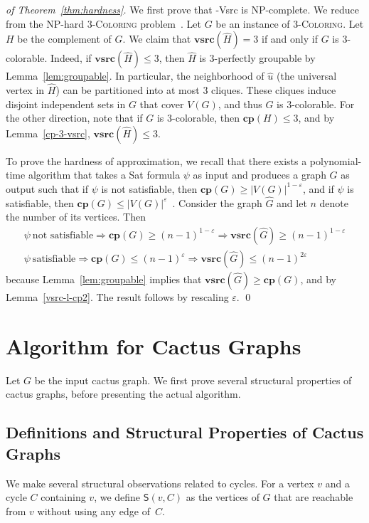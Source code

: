 \documentclass[letter,runningheads,envcountsame,envcountsect]{llncs}
\newcommand{\vsrc}{\mathbf{vsrc}}
\newcommand{\tvsrc}{{\sc 3-Vsrc}}
\newcommand{\cp}{\mathbf{cp}}
\newcommand{\sat}{{\sc Sat}}
\newcommand{\subg}{\mathsf{S}}
\begin{document}
\begin{proof}[of Theorem~\ref{thm:hardness}]
	We first prove that {\tvsrc} is NP-complete. We reduce from the NP-hard \textsc{$3$-Coloring} problem~\cite{gary1979computers}. Let $G$ be an instance of \textsc{$3$-Coloring}. Let $H$ be the complement of $G$. We claim that $\vsrc(\hat{H}) = 3$ if and only if $G$ is $3$-colorable. Indeed, if $\vsrc(\hat{H}) \leq 3$, then $\hat{H}$ is $3$-perfectly groupable by Lemma~\ref{lem:groupable}. In particular, the neighborhood of $\hat{u}$ (the universal vertex in $\hat{H}$) can be partitioned into at most $3$ cliques. These cliques induce disjoint independent sets in $G$ that cover $V(G)$, and thus $G$ is $3$-colorable. For the other direction, note that if $G$ is $3$-colorable, then $\cp(H) \leq 3$, and by Lemma~\ref{cp-3-vsrc}, $\vsrc(\hat{H}) \leq 3$.

To prove the hardness of approximation, we recall that there exists a polynomial-time algorithm that takes a {\sat} formula $\psi$ as input and produces a graph $G$ as output such that if $\psi$ is not satisfiable, then $\cp(G) \geq |V(G)|^{1-\varepsilon}$, and if $\psi$ is satisfiable, then $\cp(G)  \leq |V(G)|^{\varepsilon}$~\cite[Proof of Theorem 2]{zuckerman2006linear}. Consider the graph $\hat{G}$ and let $n$ denote the number of its vertices. Then
\begin{align*}\psi\ \mbox{not satisfiable} \Rightarrow \cp(G)\ge (n-1)^{1-\varepsilon} \Rightarrow \vsrc(\hat{G})\ge (n-1)^{1-\varepsilon}\\
\psi\ \mbox{satisfiable} \Rightarrow \cp(G)\le (n-1)^{\varepsilon} \Rightarrow \vsrc(\hat{G})\le (n-1)^{2\varepsilon}\end{align*}
because Lemma~\ref{lem:groupable} implies that $\vsrc(\hat G)\ge \cp(G)$, and 
by Lemma~\ref{vsrc-l-cp2}. The result follows by rescaling $\varepsilon$.
\qed\end{proof}

\section{Algorithm for Cactus Graphs}
\label{sec:polynomial_time_algorithm_for_very_strong_rainbow_coloring_cactus_graphs}
Let $G$ be the input cactus graph. 
We first prove several structural properties of cactus graphs, before presenting the actual algorithm.

\subsection{Definitions and Structural Properties of Cactus Graphs}
We make several structural observations related to cycles.
For a vertex $v$ and a cycle $C$ containing $v$, we define $\subg\left(v,C\right)$ as the vertices of $G$ that are reachable from $v$ without using any edge of~$C$.
\end{document}
